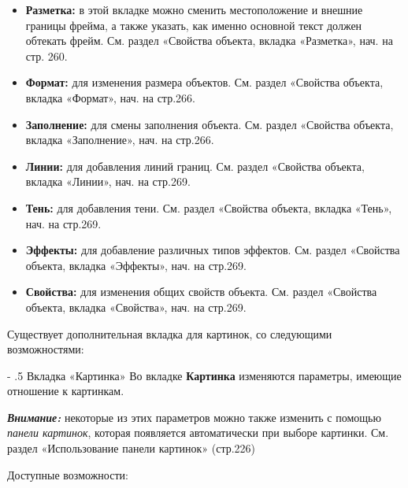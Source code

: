 \documentclass[a4paper,10pt]{article}
\makeatletter
\renewcommand\paragraph{%
   \@startsection{paragraph}{4}{0mm}%
      {-\baselineskip}%
      {.5\baselineskip}%
      {\normalfont\normalsize\bfseries}}
\makeatother
\begin{document}
\begin{itemize}
 \item \textbf{Разметка:} в этой вкладке можно сменить местоположение и внешние границы фрейма, а также указать, как именно основной текст должен обтекать фрейм. См. раздел «Свойства объекта, вкладка «Разметка», нач. на стр. 260.
 \item \textbf{Формат:} для изменения размера объектов. См. раздел «Свойства объекта, вкладка «Формат», нач. на стр.266.
 \item \textbf{Заполнение:} для смены заполнения объекта. См. раздел «Свойства объекта, вкладка «Заполнение», нач. на стр.266.
 \item \textbf{Линии:} для добавления линий границ. См. раздел «Свойства объекта, вкладка «Линии», нач. на стр.269.
 \item \textbf{Тень:} для добавления тени. См. раздел «Свойства объекта, вкладка «Тень», нач. на стр.269.
 \item \textbf{Эффекты:} для добавление различных типов эффектов. См. раздел «Свойства объекта, вкладка «Эффекты», нач. на стр.269.
 \item \textbf{Свойства:} для изменения общих свойств объекта. См. раздел «Свойства объекта, вкладка «Свойства», нач. на стр.269.
\end{itemize}

Существует дополнительная вкладка для картинок, со следующими возможностями:

\paragraph{Вкладка «Картинка»}
Во вкладке \textbf{Картинка} изменяются параметры, имеющие отношение к картинкам.

\begin{mdframed}[backgroundcolor=blue!10]
\textbf{\textit{Внимание:}} некоторые из этих параметров можно также изменить с помощью \textit{панели картинок}, которая появляется автоматически при выборе картинки. См. раздел «Использование панели картинок» (стр.226)
\end{mdframed}

Доступные возможности:
\end{document}
